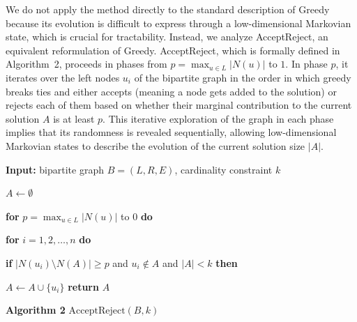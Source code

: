 We do not apply the method directly to the standard description of Greedy because its evolution is difficult to express through a low-dimensional Markovian state, which is crucial for tractability. Instead, we analyze
AcceptReject, an equivalent reformulation of Greedy.
AcceptReject, which is formally defined in Algorithm 2, proceeds in phases from $p=\max_{u\in L}|N(u)|$ to $1$. In phase $p$, it iterates over the left nodes $u_{i}$ of the bipartite graph in the order in which greedy breaks ties and either accepts (meaning a node gets added to the solution) or rejects each of them based on whether their marginal contribution to the current solution $A$ is at least $p$. This iterative exploration of the graph in each phase implies that its randomness is revealed sequentially, allowing low-dimensional Markovian states to describe the evolution of the current solution size $|A|$.\par





                
                
              \textbf{Input:} bipartite graph $B=(L,R,E)$, cardinality constraint $k$



                
                
              $A\leftarrow\emptyset$



                
                
              \textbf{for} $p=\max_{u\in L}|N(u)|$ to $0$ \textbf{do}



                
                
              \quad \enspace \textbf{for} $i=1,2,\dots,n$ \textbf{do}



                
                
              \quad \quad \quad \textbf{if} $|N(u_{i})\setminus N(A)|\geq p$ and $u_{i}\notin A$ and $|A|<k$ \textbf{then}



                
                
              \quad \quad \quad \quad \enspace $A\leftarrow A\cup\{u_{i}\}$
\quad \quad \quad \quad \enspace \textbf{return} $A$



\textbf{Algorithm 2}  $\text{{AcceptReject}}(B,k)$



